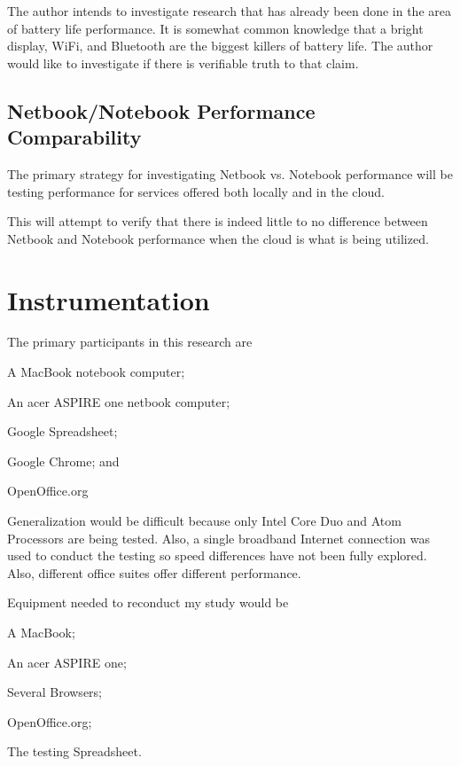 The author intends to investigate research that has already been done in the
area of battery life performance.  It is somewhat common knowledge that a bright
display, WiFi, and Bluetooth are the biggest killers of battery life.  The
author would like to investigate if there is verifiable truth to that claim.

\subsection{Netbook/Notebook Performance Comparability}

The primary strategy for investigating Netbook vs. Notebook performance will be
testing performance for services offered both locally and in the cloud.

This will attempt to verify that there is indeed little to no difference between
Netbook and Notebook performance when the cloud is what is being utilized.

\section{Instrumentation}


The primary participants in this research are 
\begin{inparaenum}[(1)]
\item A MacBook notebook computer;
\item An acer ASPIRE one netbook computer;
\item Google Spreadsheet;
\item Google Chrome; and
\item OpenOffice.org
\end{inparaenum}

Generalization would be difficult because only Intel Core Duo and Atom
Processors are being tested.  Also, a single broadband Internet connection was
used to conduct the testing so speed differences have not been fully explored.
Also, different office suites offer different performance.

Equipment needed to reconduct my study would be
\begin{inparaenum}[(1)]
\item A MacBook;
\item An acer ASPIRE one;
\item Several Browsers;
\item OpenOffice.org;
\item The testing Spreadsheet.
\end{inparaenum}

